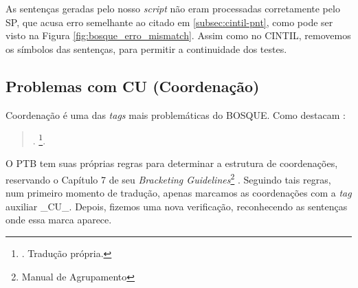 As sentenças geradas pelo nosso \textit{script} não eram processadas corretamente pelo SP, que acusa erro semelhante ao citado em \ref{subsec:cintil-pnt}, como pode ser visto na Figura \ref{fig:bosque_erro_mismatch}. Assim como no CINTIL, removemos os símbolos das sentenças, para permitir a continuidade dos testes.
\begin{center}
    
\end{center}
\subsection{Problemas com CU (Coordenação)}
\label{subsec:cu}
Coordenação é uma das \textit{tags} mais problemáticas do BOSQUE. Como destacam :
\begin{quote}
    .
    \footnote{. Tradução própria.}.
\end{quote}

O PTB tem suas próprias regras para determinar a estrutura de coordenações, reservando o Capítulo 7 de seu \textit{Bracketing Guidelines}\footnote{Manual de Agrupamento} \cite[p~117]{bracketing_ptb}. Seguindo tais regras, num primeiro momento de tradução, apenas marcamos as coordenações com a \textit{tag} auxiliar \_CU\_. Depois, fizemos uma nova verificação, reconhecendo as sentenças onde essa marca aparece.
\begin{center}
    
\end{center}

